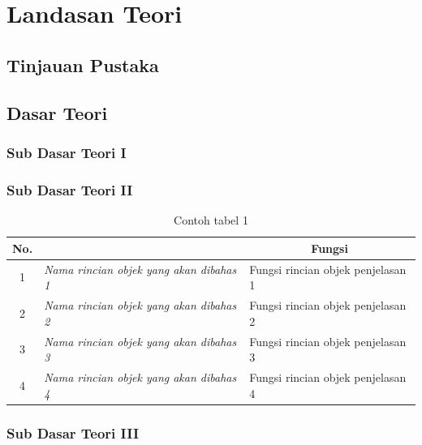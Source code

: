 \chapter[Landasan Teori]{\\ Landasan Teori}

\section{Tinjauan Pustaka}
\lipsum[2]

\section{Dasar Teori}
\subsection{Sub Dasar Teori I}
\lipsum[2]

\subsection{Sub Dasar Teori II}
\lipsum[2]

\begin{table}[H]
    \centering
    \caption{Contoh tabel 1}
    \label{t blok}
    \begin{tabular}{|c|l|l|}
        \hline
        \rowcolor[HTML]{C0C0C0} 
        {\color[HTML]{000000} No.} & \multicolumn{1}{c|}{\cellcolor[HTML]{C0C0C0}{\color[HTML]{000000} Nama}} & \multicolumn{1}{c|}{\cellcolor[HTML]{C0C0C0}Fungsi}  \\ \hline
        \rowcolor[HTML]{FFFFFF} 
        1 & \textit{Nama rincian objek yang akan dibahas 1} & Fungsi rincian objek penjelasan 1 \\ \hline
        2 & \textit{Nama rincian objek yang akan dibahas 2} & Fungsi rincian objek penjelasan 2 \\ \hline
        3 & \textit{Nama rincian objek yang akan dibahas 3} & Fungsi rincian objek penjelasan 3 \\ \hline
        4 & \textit{Nama rincian objek yang akan dibahas 4} & Fungsi rincian objek penjelasan 4 \\ \hline
    \end{tabular}
\end{table}


\subsection{Sub Dasar Teori III}
\lipsum[2]

